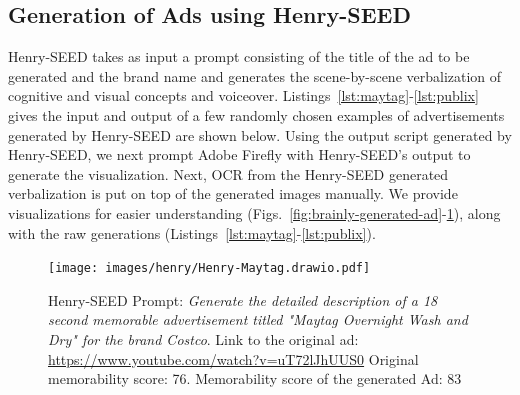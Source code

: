 

\subsection{Generation of Ads using Henry-SEED}
\label{sec:Generated Ad Samples}


Henry-SEED takes as input a prompt consisting of the title of the ad to be generated and the brand name and generates the scene-by-scene verbalization of cognitive and visual concepts and voiceover. Listings~\ref{lst:maytag}-\ref{lst:publix} gives the input and output of a few randomly chosen examples of advertisements generated by Henry-SEED are shown below. Using the output script generated by Henry-SEED, we next prompt Adobe Firefly \cite{adobefirefly} with Henry-SEED's output to generate the visualization. Next, OCR from the Henry-SEED generated verbalization is put on top of the generated images manually. We provide visualizations for easier understanding (Figs.~\ref{fig:brainly-generated-ad}-\ref{fig:maytag-generated-ad}), along with the raw generations (Listings~\ref{lst:maytag}-\ref{lst:publix}). 



\begin{figure}[]
    \centering
    \texttt{[image: images/henry/Henry-Maytag.drawio.pdf]}
    \caption{Henry-SEED Prompt: \textit{Generate the detailed description of a 18 second memorable advertisement titled "Maytag Overnight Wash and Dry" for the brand Costco}. Link to the original ad: \url{https://www.youtube.com/watch?v=uT72lJhUUS0} Original memorability score: 76. Memorability score of the generated Ad: 83}
    \label{fig:maytag-generated-ad}
\end{figure}



